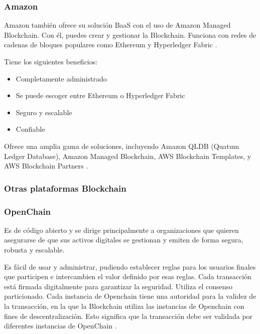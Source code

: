 \subsubsection*{Amazon}

Amazon también ofrece su solución BaaS con el uso de Amazon Managed Blockchain. Con él, puedes crear y gestionar la 
Blockchain. Funciona con redes de cadenas de bloques populares como Ethereum y Hyperledger Fabric 
\cite{top-blockchain-platforms}.

\vspace{5mm}

\noindent Tiene los siguientes beneficios:

\begin{itemize}
    \item Completamente administrado
    \item Se puede escoger entre Ethereum o Hyperledger Fabric
    \item Seguro y escalable
    \item Confiable
\end{itemize}

\noindent Ofrece una amplia gama de soluciones, incluyendo Amazon QLDB (Quatum Ledger Database), Amazon Managed 
Blockchain, AWS Blockchain Templates, y AWS Blockchain Partners \cite{top-blockchain-platforms}.

\subsubsection{Otras plataformas Blockchain}

\subsubsection*{OpenChain}

Es de código abierto y se dirige principalmente a organizaciones que quieren asegurarse de que sus activos digitales
se gestionan y emiten de forma segura, robusta y escalable.

\vspace{5mm}

\noindent Es fácil de usar y administrar, pudiendo establecer reglas para los usuarios finales que participen e 
intercambien el valor definido por esas reglas. Cada transacción está firmada digitalmente para garantizar la 
seguridad. Utiliza el consenso particionado. Cada instancia de Openchain tiene una autoridad para la validez de 
la transacción, en la que la Blockchain utiliza las instancias de Openchain con fines de descentralización. Esto 
significa que la transacción debe ser validada por diferentes instancias de OpenChain \cite{top-blockchain-platforms}.


